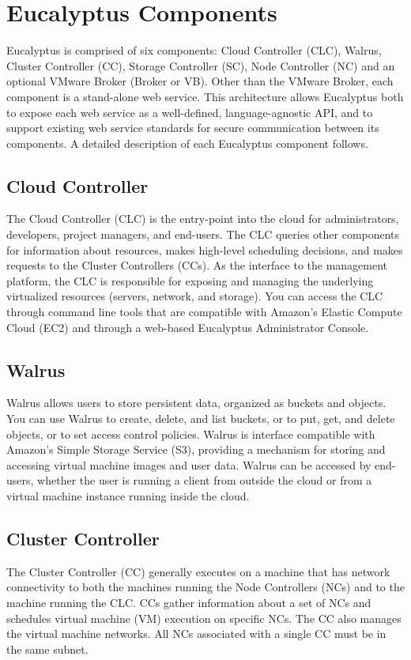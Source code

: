 \section{Eucalyptus Components}
Eucalyptus is comprised of six components: Cloud Controller (CLC), Walrus, Cluster Controller (CC), Storage Controller (SC), Node Controller (NC) and an optional VMware Broker (Broker or VB). Other than the VMware Broker, each component is a stand-alone web service. This architecture allows Eucalyptus both to expose each web service as a well-defined, language-agnostic API, and to support existing web service standards for secure communication between its components.
A detailed description of each Eucalyptus component follows.\linebreak
\subsection{Cloud Controller}
The Cloud Controller (CLC) is the entry-point into the cloud for administrators, developers, project managers, and end-users. The CLC queries other components for information about resources, makes high-level scheduling decisions, and makes requests to the Cluster Controllers (CCs). As the interface to the management platform, the CLC is responsible for exposing and managing the underlying virtualized resources (servers, network, and storage). You can access the CLC through command line tools that are compatible with Amazon’s Elastic Compute Cloud (EC2) and through a web-based Eucalyptus Administrator Console.
\subsection{Walrus}
Walrus allows users to store persistent data, organized as buckets and objects. You can use Walrus to create, delete, and list buckets, or to put, get, and delete objects, or to set access control policies. Walrus is interface compatible with Amazon’s Simple Storage Service (S3), providing a mechanism for storing and accessing virtual machine images and user data. Walrus can be accessed by end-users, whether the user is running a client from outside the cloud or from a virtual machine instance running inside the cloud.
\subsection{Cluster Controller}
The Cluster Controller (CC) generally executes on a machine that has network connectivity to both the machines running the Node Controllers (NCs) and to the machine running the CLC. CCs gather information about a set of NCs and schedules virtual machine (VM) execution on specific NCs. The CC also manages the virtual machine networks. All NCs associated with a single CC must be in the same subnet.
